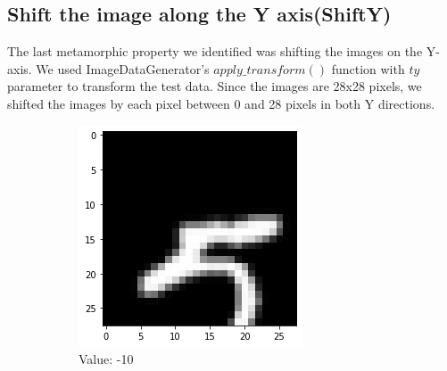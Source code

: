 \subsection{Shift the image along the Y axis(ShiftY)}
The last metamorphic property we identified was shifting the images on the Y-axis. We used ImageDataGenerator's $apply\_transform()$ function with $ty$ parameter to transform the test data. Since the images are 28x28 pixels, we shifted the images by each pixel between 0 and 28 pixels in both Y directions. 
    \begin{figure}[htb!]
        \centering
        \begin{subfigure}[b]{.3\textwidth}
            \centering
            \includegraphics[width=\linewidth]{images/shifty1.png}
            \caption{Value: -10}
            \label{fig:Rotate-misclass0}
        \end{subfigure}%
        \begin{subfigure}[b]{.3\textwidth}
            \centering

\end{subfigure}
\end{figure}
